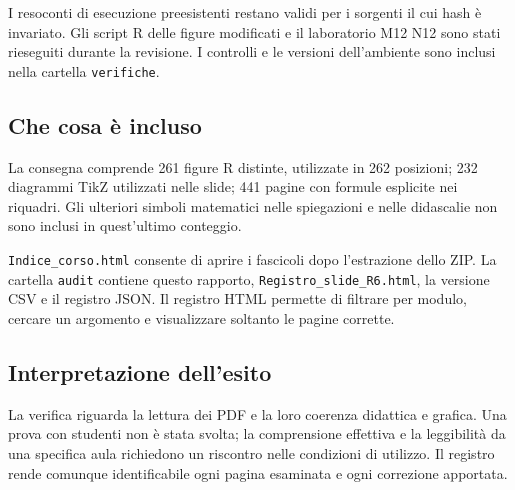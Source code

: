 \documentclass[11pt,a4paper]{article}
\begin{document}
I resoconti di esecuzione preesistenti restano validi per i sorgenti il cui hash è invariato. Gli script R delle figure modificati e il laboratorio M12 N12 sono stati rieseguiti durante la revisione. I controlli e le versioni dell’ambiente sono inclusi nella cartella \texttt{verifiche}.

\subsection*{Che cosa è incluso}
La consegna comprende 261 figure R distinte, utilizzate in 262 posizioni; 232 diagrammi TikZ utilizzati nelle slide; 441 pagine con formule esplicite nei riquadri. Gli ulteriori simboli matematici nelle spiegazioni e nelle didascalie non sono inclusi in quest’ultimo conteggio.

\texttt{Indice\_corso.html} consente di aprire i fascicoli dopo l’estrazione dello ZIP. La cartella \texttt{audit} contiene questo rapporto, \texttt{Registro\_slide\_R6.html}, la versione CSV e il registro JSON. Il registro HTML permette di filtrare per modulo, cercare un argomento e visualizzare soltanto le pagine corrette.

\subsection*{Interpretazione dell’esito}
La verifica riguarda la lettura dei PDF e la loro coerenza didattica e grafica. Una prova con studenti non è stata svolta; la comprensione effettiva e la leggibilità da una specifica aula richiedono un riscontro nelle condizioni di utilizzo. Il registro rende comunque identificabile ogni pagina esaminata e ogni correzione apportata.
\end{document}
